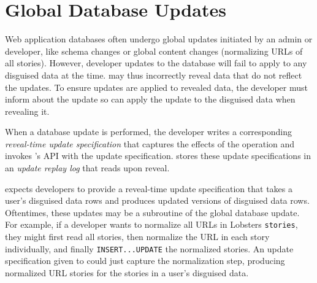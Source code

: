 %
%

\section{Global Database Updates} 
\label{s:overview:updates}

Web application databases often undergo global updates 
initiated by an admin or developer, like schema changes or global content
changes (\eg normalizing URLs of all stories). 
%
However, developer updates to the database will fail to apply to any disguised
data at the time. \sys may thus incorrectly reveal data that do not
reflect the updates. 
%
To ensure updates are applied to revealed data, the developer must inform \sys
about the update so \sys can apply the update to the disguised data when
revealing it.

When a database update is performed, the developer writes a corresponding
\emph{reveal-time update specification} that captures the effects of the
operation and invokes \sys's API with the update specification. \sys stores
these update specifications in an \emph{update replay log} that \sys reads upon
reveal.
%
%

%

%
\sys expects developers to provide a reveal-time update specification that takes
a user's disguised data rows and produces updated versions of disguised data rows.
%
Oftentimes, these updates may be a subroutine of the global
database update. 
%
For example, if a developer wants to normalize all URLs in Lobsters
\texttt{stories}, they might first read all stories, then normalize the URL in
each story individually, and finally \texttt{INSERT...UPDATE} the normalized
stories. 
%
An update specification given to \sys could just capture the normalization step,
producing normalized URL stories for the stories in a user's disguised data.
%


